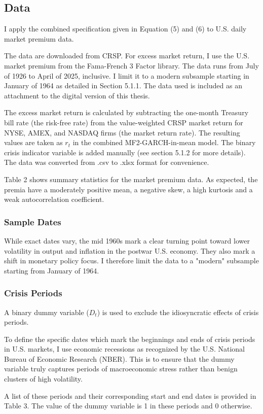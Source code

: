 \documentclass[12pt]{article}
\begin{document}
\subsection{Data}
I apply the combined specification given in Equation (5) and (6) to U.S. daily market premium data.\par
The data are downloaded from CRSP. For excess market return, I use the U.S. market premium from the Fama-French 3 Factor library. The data runs from July of 1926 to April of 2025, inclusive. I limit it to a modern subsample starting in January of 1964 as detailed in Section 5.1.1. The data used is included as an attachment to the digital version of this thesis.\par
The excess market return is calculated by subtracting the one-month Treasury bill rate (the risk-free rate) from the value-weighted CRSP market return for NYSE, AMEX, and NASDAQ firms (the market return rate). The resulting values are taken as $r_t$ in the combined MF2-GARCH-in-mean model. The binary crisis indicator variable is added manually (see section 5.1.2 for more details). The data was converted from .csv to .xlsx format for convenience.\par
Table 2 shows summary statistics for the market premium data. As expected, the premia have a moderately positive mean, a negative skew, a high kurtosis and a weak autocorrelation coefficient.
\subsubsection{Sample Dates}
While exact dates vary, the mid 1960s mark a clear turning point toward lower volatility in output and inflation in the postwar U.S. economy. They also mark a shift in monetary policy focus. I therefore limit the data to a "modern" subsample starting from January of 1964.
\subsubsection{Crisis Periods}
A binary dummy variable ($D_t$) is used to exclude the idiosyncratic effects of crisis periods.\par
To define the specific dates which mark the beginnings and ends of crisis periods in U.S. markets, I use economic recessions as recognized by the U.S. National Bureau of Economic Research (NBER). This is to ensure that the dummy variable truly captures periods of macroeconomic stress rather than benign clusters of high volatility.\par
A list of these periods and their corresponding start and end dates is provided in Table 3. The value of the dummy variable is 1 in these periods and 0 otherwise.
\end{document}
